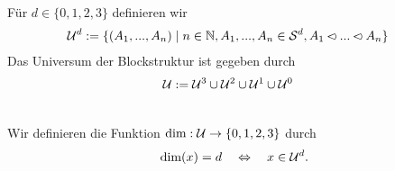 

\begin{dfn}\ \\
Für $d \in \{0,1,2,3\}$ definieren wir
    \begin{align*}
        \univ^d &:= \{(A_1, ...,  A_n) \mid n \in \N, A_1, ..., A_n \in \einf^d, A_1 \vor ... \vor A_n\}%
    \end{align*}
    Das Universum der Blockstruktur ist gegeben durch
    \begin{align*}
        \mathcal{U} &:= \mathcal{U}^3 \cup \mathcal{U}^2 \cup \mathcal{U}^1 \cup \mathcal{U}^0
    \end{align*}
\end{dfn}


\begin{dfn}\ \\
    Wir definieren die Funktion $\text{dim} : \mathcal{U} \to \{0,1,2,3\}$ durch
    $$\text{dim}(x) = d \quad \Leftrightarrow \quad x \in \mathcal{U}^d.$$
\end{dfn}

